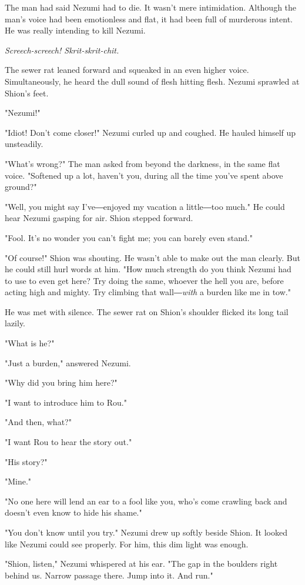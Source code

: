 The man had said Nezumi had to die. It wasn't mere intimidation.
Although the man's voice had been emotionless and flat, it had been full
of murderous intent. He was really intending to kill Nezumi.

\emph{Screech-screech! Skrit-skrit-chit.}

The sewer rat leaned forward and squeaked in an even higher voice.
Simultaneously, he heard the dull sound of flesh hitting flesh. Nezumi
sprawled at Shion's feet.

"Nezumi!"

"Idiot! Don't come closer!" Nezumi curled up and coughed. He hauled
himself up unsteadily.

"What's wrong?" The man asked from beyond the darkness, in the same flat
voice. "Softened up a lot, haven't you, during all the time you've spent
above ground?"

"Well, you might say I've―enjoyed my vacation a little―too much." He
could hear Nezumi gasping for air. Shion stepped forward.

"Fool. It's no wonder you can't fight me; you can barely even stand."

"Of course!" Shion was shouting. He wasn't able to make out the man
clearly. But he could still hurl words at him. "How much strength do you
think Nezumi had to use to even get here? Try doing the same, whoever
the hell you are, before acting high and mighty. Try climbing that
wall―\emph{with} a burden like me in tow."

He was met with silence. The sewer rat on Shion's shoulder flicked its
long tail lazily.

"What is he?"

"Just a burden," answered Nezumi.

"Why did you bring him here?"

"I want to introduce him to Rou."

"And then, what?"

"I want Rou to hear the story out."

"His story?"

"Mine."

"No one here will lend an ear to a fool like you, who's come crawling
back and doesn't even know to hide his shame."

"You don't know until you try." Nezumi drew up softly beside Shion. It
looked like Nezumi could see properly. For him, this dim light was
enough.

"Shion, listen," Nezumi whispered at his ear. "The gap in the boulders
right behind us. Narrow passage there. Jump into it. And run."

